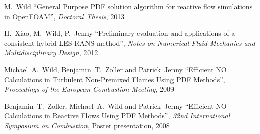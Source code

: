 \documentclass[line,11pt,a4paper]{../resume}
\begin{document}
\begin{resume}
M.~Wild
``General Purpose PDF solution algorithm for reactive flow simulations in
OpenFOAM'', \textsl{Doctoral Thesis}, 2013

\vspace{-2mm}
H.~Xiao, M.~Wild, P.~Jenny
``Preliminary evaluation and applications of a consistent hybrid LES-RANS
method'', \textsl{Notes on Numerical Fluid Mechanics and Multidisciplinary
Design}, 2012

\vspace{-2mm}
Michael~A.~Wild, Benjamin~T.~Zoller and Patrick~Jenny
``Efficient $\mathrm{NO}$ Calculations in Turbulent Non-Premixed Flames Using
PDF Methods'', \textsl{Proceedings of the European Combustion Meeting}, 2009

\vspace{-2mm}
Benjamin~T.~Zoller, Michael~A.~Wild and Patrick~Jenny
``Efficient $\mathrm{NO}$ Calculations in Reactive Flows Using PDF Methods'',
\textsl{32nd International Symposium on Combustion}, Poster presentation, 2008



\end{resume}
\end{document}
